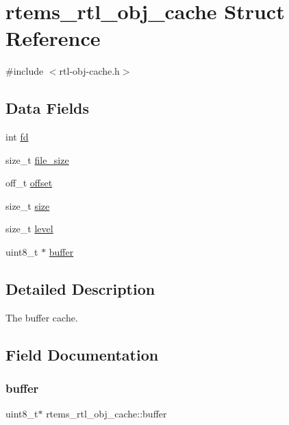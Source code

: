\hypertarget{structrtems__rtl__obj__cache}{}\section{rtems\+\_\+rtl\+\_\+obj\+\_\+cache Struct Reference}
\label{structrtems__rtl__obj__cache}


{\ttfamily \#include $<$rtl-\/obj-\/cache.\+h$>$}

\subsection*{Data Fields}
\begin{DoxyCompactItemize}
\item 
int \mbox{\hyperlink{structrtems__rtl__obj__cache_a2b210774893a9274d70430b6990861e6}{fd}}
\item 
size\+\_\+t \mbox{\hyperlink{structrtems__rtl__obj__cache_a02a8e524e7ea0b47bc3217e4363b9388}{file\+\_\+size}}
\item 
off\+\_\+t \mbox{\hyperlink{structrtems__rtl__obj__cache_a8f70d67ca5dfbdf4d14922829552355a}{offset}}
\item 
size\+\_\+t \mbox{\hyperlink{structrtems__rtl__obj__cache_a3ceefd27ca6b0fa48f1803dc8e72dcda}{size}}
\item 
size\+\_\+t \mbox{\hyperlink{structrtems__rtl__obj__cache_a956761b9b108b91a33d5329f5cafc5e6}{level}}
\item 
uint8\+\_\+t $\ast$ \mbox{\hyperlink{structrtems__rtl__obj__cache_a1b3284709ec2da1e8bc8f98192eba7fd}{buffer}}
\end{DoxyCompactItemize}


\subsection{Detailed Description}
The buffer cache. 

\subsection{Field Documentation}
\mbox{\label{structrtems__rtl__obj__cache_a1b3284709ec2da1e8bc8f98192eba7fd}} 
\subsubsection{\texorpdfstring{buffer}{buffer}}
{\footnotesize\ttfamily uint8\+\_\+t$\ast$ rtems\+\_\+rtl\+\_\+obj\+\_\+cache\+::buffer}

